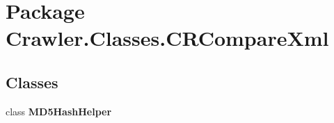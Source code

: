 \hypertarget{namespace_crawler_1_1_classes_1_1_c_r_compare_xml}{\section{Package Crawler.\-Classes.\-C\-R\-Compare\-Xml}
\label{namespace_crawler_1_1_classes_1_1_c_r_compare_xml}
}
\subsection*{Classes}
\begin{DoxyCompactItemize}
\item 
class {\bfseries M\-D5\-Hash\-Helper}
\end{DoxyCompactItemize}
